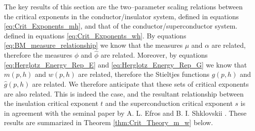 \documentclass[jmp,graphicx]{revtex4-1}
\newcommand{\ph}{\hat{\phi}}
\begin{document}
The key results of this section are the two--parameter scaling
relations between the critical exponents in the conductor/insulator
system, defined in equations \eqref{eq:Crit_Exponents_mh},
and that of the conductor/superconductor system.
defined in equations \eqref{eq:Crit_Exponents_wh}.
By equations  \eqref{eq:BM_measure_relationship} we know that the
measures $\mu$ and $\alpha$ are related, therefore the measures $\phi$ and $\ph$
are related. Moreover, by equations \eqref{eq:Herglotz_Energy_Rep_E}
and \eqref{eq:Herglotz_Energy_Rep_G} we know that $m(p,h)$ and
$w(p,h)$ are related, therefore the Stieltjes functions $g(p,h)$ and
$\hat{g}(p,h)$ are related. We therefore anticipate that these sets of
critical exponents 
are also related. This is indeed the case, and the resultant
relationship between the insulation critical exponent $t$ and the
superconduction critical exponent $s$ is in agreement with the seminal
paper by A. L. Efros and B. I. Shklovskii \cite{Efros:PSSB-303}.
These results are summarized in Theorem \ref{thm:Crit_Theory_m_w}
below. 
%
%
%
\end{document}
